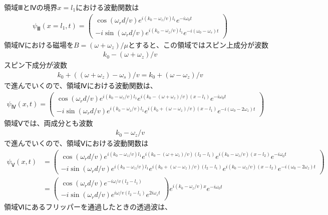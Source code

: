 $領域ⅢとⅣの境界x=l_{1}における波動関数は$
\begin{align}
{\psi}_{Ⅲ}(x=l_{1},t)=
\begin{pmatrix}
\cos(\omega_{r}d/v)e^{i(k_{0}-\omega_{z}/v)l_{1}}e^{-i\omega_{0}t} \\
-i\sin(\omega_{r}d/v)e^{i(k_{0}-\omega_{z}/v)l_{1}}e^{-i(\omega_{0}-\omega_{s})t}
\end{pmatrix}
\end{align}
$領域Ⅳにおける磁場をB=(\omega+\omega_{z})/{\mu}とすると、この領域ではスピン上成分が波数$
\begin{align}
k_{0}-(\omega+\omega_{z})/v
\end{align}
スピン下成分が波数
\begin{align}
k_{0}+((\omega+\omega_{z})-\omega_{s})/v=k_{0}+(\omega-\omega_{z})/v
\end{align}
で進んでいくので、領域Ⅳにおける波動関数は、
\begin{align}
{\psi}_{Ⅳ}(x,t)=
\begin{pmatrix}
\cos(\omega_{r}d/v)e^{i(k_{0}-\omega_{z}/v)l_{1}}e^{i(k_{0}-(\omega+\omega_{z})/v)(x-l_{1})}e^{-i\omega_{0}t} \\
-i\sin(\omega_{r}d/v)e^{i(k_{0}-\omega_{z}/v)l_{1}}e^{i(k_{0}+(\omega-\omega_{z})/v)(x-l_{1})}e^{-i(\omega_{0}-2\omega_{z})t}
\end{pmatrix}
\end{align}
領域Ⅴでは、両成分とも波数
\begin{align}
k_{0}-\omega_{z}/v
\end{align}
で進んでいくので、領域Ⅴにおける波動関数は
\begin{align}
{\psi}_{Ⅴ}(x,t)&=
\begin{pmatrix}
\cos(\omega_{r}d/v)e^{i(k_{0}-\omega_{z}/v)l_{1}}e^{i(k_{0}-(\omega+\omega_{z})/v)(l_{2}-l_{1})}e^{i(k_{0}-\omega_{z}/v)(x-l_{2})}e^{-i\omega_{0}t} \\
-i\sin(\omega_{r}d/v)e^{i(k_{0}-\omega_{z}/v)l_{1}}e^{i(k_{0}+(\omega-\omega_{z})/v)(l_{2}-l_{1})}e^{i(k_{0}-\omega_{z}/v)(x-l_{2})}e^{-i(\omega_{0}-2\omega_{z})t}
\end{pmatrix}   \\
&=\begin{pmatrix}
\cos(\omega_{r}d/v)e^{-i\omega/v(l_{2}-l_{1})}\\
-i\sin(\omega_{r}d/v)e^{i\omega/v(l_{2}-l_{1})}e^{2i\omega_{z}t}
\end{pmatrix}
e^{i(k_{0}-\omega_{z}/v)x}e^{-i\omega_{0}t} 
\end{align}
領域Ⅵにあるフリッパーを通過したときの透過波は、
